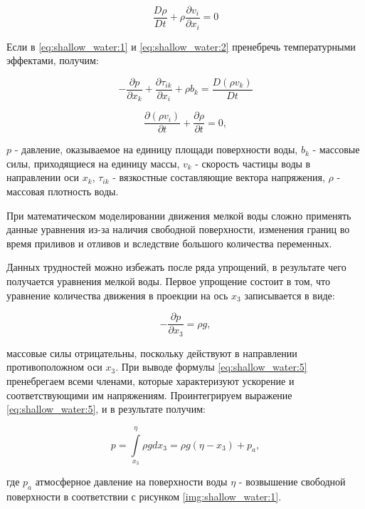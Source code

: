 \documentclass[14pt]{extreport}
\begin{document}
\begin{equation}\label{eq:shallow_water:2}
\frac{D\rho}{Dt}+\rho \frac{\partial v_i}{\partial x_i} =0
\end{equation}

Если в \ref{eq:shallow_water:1} и \ref{eq:shallow_water:2} пренебречь температурными эффектами, получим:

\begin{equation}\label{eq:shallow_water:3}
-\frac{\partial p}{\partial x_k} + \frac{\partial \tau_{ik}}{\partial x_i} + \rho b_k = \frac{D(\rho v_k)}{Dt}
\end{equation}

\begin{equation}\label{eq:shallow_water:4}
\frac{\partial (\rho v_i)}{\partial t} + \frac{\partial \rho}{\partial t}=0,
\end{equation}

 $ p $ - давление, оказываемое на единицу площади поверхности воды, $ b_k $ - массовые силы, приходящиеся на единицу массы, $v_k$ - скорость частицы воды в направлении оси $x_k$, $\tau_{ik}$ - вязкостные составляющие вектора напряжения, $ \rho $ - массовая плотность воды.

При математическом моделировании движения мелкой воды сложно применять данные уравнения из-за наличия свободной поверхности, изменения границ во время приливов и отливов и вследствие большого количества переменных.

Данных трудностей можно избежать после ряда упрощений, в результате чего получается уравнения мелкой воды. Первое упрощение состоит в том, что уравнение количества движения в проекции на ось $x_3$ записывается в виде:

\begin{equation}\label{eq:shallow_water:5}
-\frac{\partial p}{\partial x_3}=\rho g, 
\end{equation}

 массовые силы отрицательны, поскольку действуют в направлении противоположном оси $ x_3 $. При выводе формулы \ref{eq:shallow_water:5} пренебрегаем всеми членами, которые характеризуют ускорение и соответствующими им напряжениям. Проинтегрируем выражение \ref{eq:shallow_water:5}, и в результате получим:

\begin{equation}\label{eq:shallow_water:6}
p = \int\limits^\eta_{x_3} \rho g dx_3 = \rho g (\eta-x_3)+p_a,
\end{equation}

\noindent где $p_a$ атмосферное давление на поверхности воды
$\eta$ - возвышение свободной поверхности в соответствии с рисунком \ref{img:shallow_water:1}.
\end{document}
